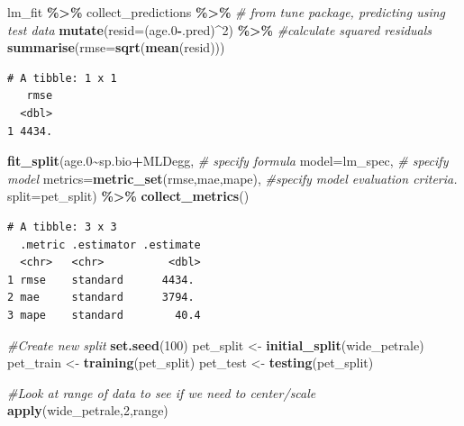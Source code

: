 \documentclass[
]{article}
\newenvironment{Shaded}{\begin{snugshade}}{\end{snugshade}}
\newcommand{\CommentTok}[1]{\textcolor[rgb]{0.56,0.35,0.01}{\textit{#1}}}
\newcommand{\DataTypeTok}[1]{\textcolor[rgb]{0.13,0.29,0.53}{#1}}
\newcommand{\DecValTok}[1]{\textcolor[rgb]{0.00,0.00,0.81}{#1}}
\newcommand{\FloatTok}[1]{\textcolor[rgb]{0.00,0.00,0.81}{#1}}
\newcommand{\KeywordTok}[1]{\textcolor[rgb]{0.13,0.29,0.53}{\textbf{#1}}}
\newcommand{\NormalTok}[1]{#1}
\newcommand{\OperatorTok}[1]{\textcolor[rgb]{0.81,0.36,0.00}{\textbf{#1}}}
\newcommand{\StringTok}[1]{\textcolor[rgb]{0.31,0.60,0.02}{#1}}
\begin{document}
\begin{Shaded}
\begin{Highlighting}[]
\NormalTok{lm\_fit }\OperatorTok{\%>\%}\StringTok{ }
\StringTok{  }\NormalTok{collect\_predictions }\OperatorTok{\%>\%}\StringTok{ }\CommentTok{\# from tune package, predicting using test data}
\StringTok{  }\KeywordTok{mutate}\NormalTok{(}\DataTypeTok{resid=}\NormalTok{(age}\FloatTok{.0}\OperatorTok{{-}}\NormalTok{.pred)}\OperatorTok{\^{}}\DecValTok{2}\NormalTok{) }\OperatorTok{\%>\%}\StringTok{ }\CommentTok{\#calculate squared residuals}
\StringTok{  }\KeywordTok{summarise}\NormalTok{(}\DataTypeTok{rmse=}\KeywordTok{sqrt}\NormalTok{(}\KeywordTok{mean}\NormalTok{(resid)))}
\end{Highlighting}
\end{Shaded}

\begin{verbatim}
# A tibble: 1 x 1
   rmse
  <dbl>
1 4434.
\end{verbatim}

\begin{Shaded}
\begin{Highlighting}[]
\KeywordTok{fit\_split}\NormalTok{(age}\FloatTok{.0}\OperatorTok{\textasciitilde{}}\NormalTok{sp.bio}\OperatorTok{+}\NormalTok{MLDegg, }\CommentTok{\# specify formula}
          \DataTypeTok{model=}\NormalTok{lm\_spec, }\CommentTok{\# specify model}
          \DataTypeTok{metrics=}\KeywordTok{metric\_set}\NormalTok{(rmse,mae,mape), }\CommentTok{\#specify model evaluation criteria.}
          \DataTypeTok{split=}\NormalTok{pet\_split) }\OperatorTok{\%>\%}\StringTok{ }
\StringTok{  }\KeywordTok{collect\_metrics}\NormalTok{()}
\end{Highlighting}
\end{Shaded}

\begin{verbatim}
# A tibble: 3 x 3
  .metric .estimator .estimate
  <chr>   <chr>          <dbl>
1 rmse    standard      4434. 
2 mae     standard      3794. 
3 mape    standard        40.4
\end{verbatim}

\begin{Shaded}
\begin{Highlighting}[]
\CommentTok{\#Create new split}
\KeywordTok{set.seed}\NormalTok{(}\DecValTok{100}\NormalTok{)}
\NormalTok{pet\_split <{-}}\StringTok{ }\KeywordTok{initial\_split}\NormalTok{(wide\_petrale)}
\NormalTok{pet\_train <{-}}\StringTok{ }\KeywordTok{training}\NormalTok{(pet\_split)}
\NormalTok{pet\_test <{-}}\StringTok{ }\KeywordTok{testing}\NormalTok{(pet\_split)}

\CommentTok{\#Look at range of data to see if we need to center/scale}
\KeywordTok{apply}\NormalTok{(wide\_petrale,}\DecValTok{2}\NormalTok{,range)}
\end{Highlighting}
\end{Shaded}
\end{document}
